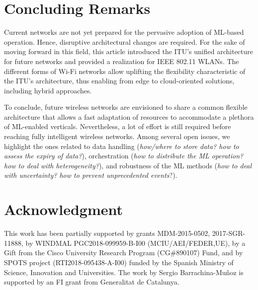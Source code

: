 \documentclass{article}
\begin{document}
\section{Concluding Remarks}
Current networks are not yet prepared for the pervasive adoption of ML-based operation. Hence, disruptive architectural changes are required. For the sake of moving forward in this field, this article introduced the ITU's unified architecture for future networks and provided a realization for IEEE 802.11 WLANs. The different forms of Wi-Fi networks allow uplifting the flexibility characteristic of the ITU's architecture, thus enabling from edge to cloud-oriented solutions, including hybrid approaches. 

To conclude, future wireless networks are envisioned to share a common flexible architecture that allows a fast adaptation of resources to accommodate a plethora of ML-enabled verticals. Nevertheless, a lot of effort is still required before reaching fully intelligent wireless networks. Among several open issues, we highlight the ones related to data handling (\textit{how/where to store data? how to assess the expiry of data?}), orchestration (\textit{how to distribute the ML operation? how to deal with heterogeneity?}), and robustness of the ML methods (\textit{how to deal with uncertainty? how to prevent unprecedented events}?). 

\section*{Acknowledgment}

This work has been partially supported by grants MDM-2015-0502, 2017-SGR-11888, by WINDMAL PGC2018-099959-B-I00 (MCIU/AEI/FEDER,UE), by a Gift from the Cisco University Research Program (CG\#890107) Fund, and by SPOTS project (RTI2018-095438-A-I00) funded by the Spanish Ministry of Science, Innovation and Universities. The work by Sergio Barrachina-Mu\~noz is supported by an FI grant from Generalitat de Catalunya.




\vfill
\end{document}

